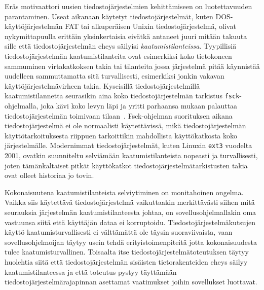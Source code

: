 Eräs motivaattori uusien tiedostojärjestelmien kehittämiseen on luotettavuuden parantaminen.
Useat aikanaan käytetyt tiedostojärjestelmät,
kuten DOS-käyttöjärjestelmän FAT tai alkuperäisen Unixin tiedostojärjestelmä,
olivat nykymittapuulla erittäin yksinkertaisia eivätkä antaneet juuri mitään takuuta sille että tiedostojärjestelmän eheys säilyisi \emph{kaatumistilanteissa}.
Tyypillisiä tiedostojärjestelmän kaatumistilanteita ovat esimerkiksi koko tietokoneen sammuminen virtakatkoksen takia tai
tilanteita jossa järjestelmä pitää käynnistää uudelleen sammuttamatta sitä turvallisesti,
esimerkiksi jonkin vakavan käyttöjärjestelmävirheen takia.
Kyseisillä tiedostojärjestelmillä kaatumistilannetta seurasikin aina koko tiedostojärjestelmän tarkistus \texttt{fsck}-ohjelmalla,
joka kävi koko levyn läpi ja yritti parhaansa mukaan palauttaa tiedostojärjestelmän toimivaan tilaan~\cite{Ext2Journal}.
Fsck-ohjelman suorituksen aikana tiedostojärjestelmä ei ole normaalisti käytettävissä,
mikä tiedostojärjestelmän käyttötarkoituksesta riippuen tarkoittikin mahdollista käyttökatkosta koko järjestelmälle.
Modernimmat tiedostojärjestelmät, kuten Linuxin \texttt{ext3} vuodelta 2001, ovatkin suunniteltu selviämään kaatumistilanteista nopeasti ja turvallisesti,
joten tämänkaltaiset pitkät käyttökatkot tiedostojärjestelmätarkistusten takia ovat olleet historiaa jo tovin.

Kokonaisuutena kaatumistilanteista selviytiminen on monitahoinen ongelma.
Vaikka siis käytettävä tiedostojärjestelmä vaikuttaakin merkittävästi siihen mitä seurauksia järjestelmän kaatumistilanteesta johtaa,
on sovellusohjelmallakin oma vastuunsa siitä että käyttäjän dataa ei korruptoidu.
Tiedostojärjestelmäkutsujen käyttö kaatumisturvallisesti ei välttämättä ole täysin suoraviivaista,
vaan sovellusohjelmoijan täytyy usein tehdä erityistoimenpiteitä jotta kokonaisuudesta tulee kaatumisturvallinen.
Toisaalta itse tiedostojärjestelmätoteutuksen täytyy huolehtia siitä että tiedostojärjestelmän sisäisten tietorakenteiden eheys säilyy kaatumistilanteessa ja että toteutus pystyy täyttämään tiedostojärjestelmärajapinnan asettamat vaatimukset joihin sovellukset luottavat.

